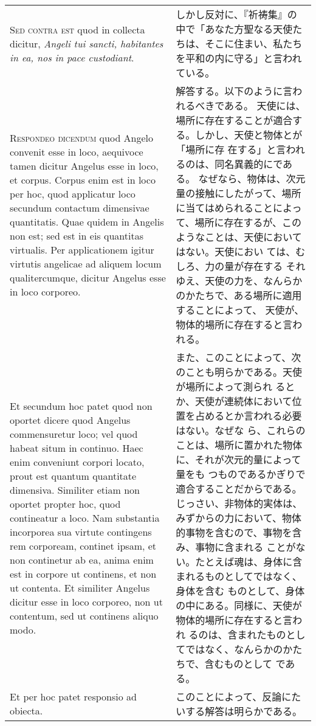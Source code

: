 \documentclass[10pt]{jsarticle} %
\begin{document}
\begin{longtable}{p{21em}p{21em}}
\\


{\scshape Sed contra est} quod in collecta dicitur, {\itshape Angeli tui sancti,
 habitantes in ea, nos in pace custodiant}.

&

しかし反対に、『祈祷集』の中で「あなた方聖なる天使たちは、そこに住まい、私たち
 を平和の内に守る」と言われている。

\\


{\scshape Respondeo dicendum} quod Angelo convenit esse in loco,
 aequivoce tamen dicitur Angelus esse in loco, et corpus. Corpus enim
 est in loco per hoc, quod applicatur loco secundum contactum dimensivae
 quantitatis. Quae quidem in Angelis non est; sed est in eis quantitas
 virtualis. Per applicationem igitur virtutis angelicae ad aliquem locum
 qualitercumque, dicitur Angelus esse in loco corporeo. 

&

解答する。以下のように言われるべきである。
天使には、場所に存在することが適合する。しかし、天使と物体とが「場所に存
 在する」と言われるのは、同名異義的にである。
なぜなら、物体は、次元量の接触にしたがって、場所に当てはめられることによっ
 て、場所に存在するが、このようなことは、天使においてはない。天使におい
 ては、むしろ、力の量が存在する
それゆえ、天使の力を、なんらかのかたちで、ある場所に適用することによって、
 天使が、物体的場所に存在すると言われる。


\\

Et secundum hoc
 patet quod non oportet dicere quod Angelus commensuretur loco; vel quod
 habeat situm in continuo. Haec enim conveniunt corpori locato, prout
 est quantum quantitate dimensiva. Similiter etiam non oportet propter
 hoc, quod contineatur a loco. Nam substantia incorporea sua virtute
 contingens rem corpoream, continet ipsam, et non continetur ab ea,
 anima enim est in corpore ut continens, et non ut contenta. Et
 similiter Angelus dicitur esse in loco corporeo, non ut contentum, sed
 ut continens aliquo modo.

&

また、このことによって、次のことも明らかである。天使が場所によって測られ
 るとか、天使が連続体において位置を占めるとか言われる必要はない。なぜな
 ら、これらのことは、場所に置かれた物体に、それが次元的量によって量をも
 つものであるかぎりで適合することだからである。じっさい、非物体的実体は、
 みずからの力において、物体的事物を含むので、事物を含み、事物に含まれる
 ことがない。たとえば魂は、身体に含まれるものとしてではなく、身体を含む
 ものとして、身体の中にある。同様に、天使が物体的場所に存在すると言われ
 るのは、含まれたものとしてではなく、なんらかのかたちで、含むものとして
 である。

\\


Et per hoc patet responsio ad obiecta.


&

このことによって、反論にたいする解答は明らかである。


\end{longtable}
\newpage
\end{document}
